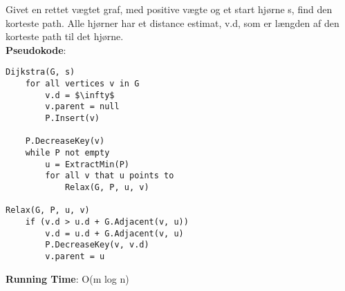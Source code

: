 Givet en rettet vægtet graf, med positive vægte og et start hjørne s, find den korteste path. Alle hjørner har et distance estimat, v.d, som er længden af den korteste path til det hjørne.\\
\textbf{Pseudokode}:
\begin{lstlisting}[frame=single, mathescape=true]
Dijkstra(G, s)
	for all vertices v in G
		v.d = $\infty$
		v.parent = null
		P.Insert(v)
	
	P.DecreaseKey(v)
	while P not empty
		u = ExtractMin(P)
		for all v that u points to
			Relax(G, P, u, v)

Relax(G, P, u, v)
	if (v.d > u.d + G.Adjacent(v, u))
		v.d = u.d + G.Adjacent(v, u)
		P.DecreaseKey(v, v.d)
		v.parent = u
\end{lstlisting}
\textbf{Running Time}: O(m log n)